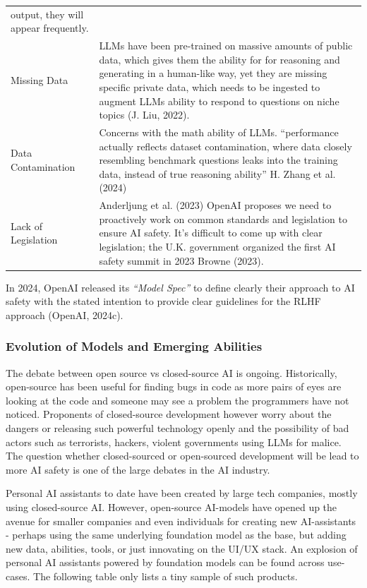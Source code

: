 \documentclass[
  12pt,
  letterpaper,
  DIV=11,
  numbers=noendperiod]{scrartcl}
\begin{document}
\begin{longtable}[]{@{}
  >{\raggedright\arraybackslash}p{}
  >{\raggedright\arraybackslash}p{}@{}}
output, they will appear frequently. \\
Missing Data & LLMs have been pre-trained on massive amounts of public
data, which gives them the ability for for reasoning and generating in a
human-like way, yet they are missing specific private data, which needs
to be ingested to augment LLMs ability to respond to questions on niche
topics (J. Liu, 2022). \\
Data Contamination & Concerns with the math ability of LLMs.
``performance actually reflects dataset contamination, where data
closely resembling benchmark questions leaks into the training data,
instead of true reasoning ability'' H. Zhang et al. (2024) \\
Lack of Legislation & Anderljung et al. (2023) OpenAI proposes we need
to proactively work on common standards and legislation to ensure AI
safety. It's difficult to come up with clear legislation; the U.K.
government organized the first AI safety summit in 2023 Browne
(2023). \\
\end{longtable}

\let\pandoctableshortcapt\relax

In 2024, OpenAI released its \emph{``Model Spec''} to define clearly
their approach to AI safety with the stated intention to provide clear
guidelines for the RLHF approach (OpenAI, 2024c).

\subsubsection{Evolution of Models and Emerging
Abilities}\label{evolution-of-models-and-emerging-abilities}

The debate between open source vs closed-source AI is ongoing.
Historically, open-source has been useful for finding bugs in code as
more pairs of eyes are looking at the code and someone may see a problem
the programmers have not noticed. Proponents of closed-source
development however worry about the dangers or releasing such powerful
technology openly and the possibility of bad actors such as terrorists,
hackers, violent governments using LLMs for malice. The question whether
closed-sourced or open-sourced development will be lead to more AI
safety is one of the large debates in the AI industry.

Personal AI assistants to date have been created by large tech
companies, mostly using closed-source AI. However, open-source AI-models
have opened up the avenue for smaller companies and even individuals for
creating new AI-assistants - perhaps using the same underlying
foundation model as the base, but adding new data, abilities, tools, or
just innovating on the UI/UX stack. An explosion of personal AI
assistants powered by foundation models can be found across use-cases.
The following table only lists a tiny sample of such products.
\end{document}
